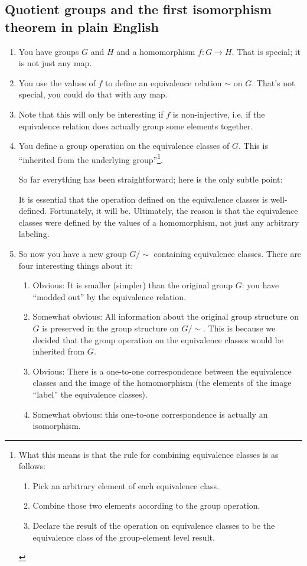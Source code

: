 \subsection{Quotient groups and the first isomorphism theorem in plain English}
\begin{enumerate}
\item You have groups $G$ and $H$ and a homomorphism $f:G \to H$. That is special; it is not just
  any map.
\item You use the values of $f$ to define an equivalence relation $\sim$ on $G$. That's not
  special, you could do that with any map.
\item Note that this will only be interesting if $f$ is non-injective, i.e. if the equivalence
  relation does actually group some elements together.
\item You define a group operation on the equivalence classes of $G$. This is ``inherited from the
  underlying group''\footnote{ What this means is that the rule for combining equivalence classes
    is as follows:
  \begin{enumerate}
  \item Pick an arbitrary element of each equivalence class.
  \item Combine those two elements according to the group operation.
  \item Declare the result of the operation on equivalence classes to be the equivalence class of
    the group-element level result.
  \end{enumerate}
}.

So far everything has been straightforward; here is the only subtle point:

It is essential that the operation defined on the equivalence classes is well-defined. Fortunately,
it will be. Ultimately, the reason is that the equivalence classes were defined by the values of a
homomorphism, not just any arbitrary labeling.
\item So now you have a new group $G/{\sim}$ containing equivalence classes. There are four
  interesting things about it:
  \begin{enumerate}
  \item Obvious: It is smaller (simpler) than the original group $G$: you have ``modded out'' by
    the equivalence relation.
  \item Somewhat obvious: All information about the original group structure on $G$ is preserved in
    the group structure on $G/{\sim}$. This is because we decided that the group operation on the
    equivalence classes would be inherited from $G$.
  \item Obvious: There is a one-to-one correspondence between the equivalence classes and the image
    of the homomorphism (the elements of the image ``label'' the equivalence classes).
  \item Somewhat obvious: this one-to-one correspondence is actually an isomorphism.


\end{enumerate}
\end{enumerate}
